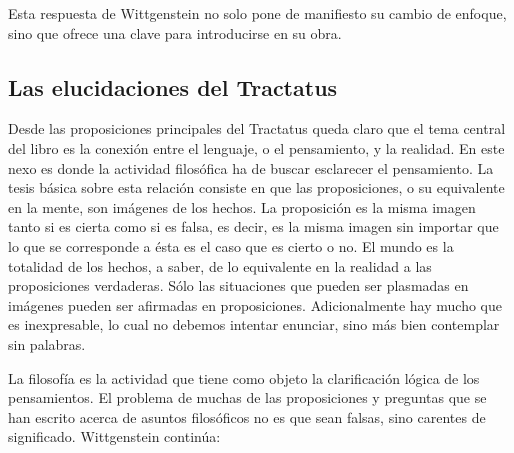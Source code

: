 Esta respuesta de Wittgenstein no solo pone de manifiesto su cambio de enfoque,
sino que ofrece una clave para introducirse en su obra. 


\subsection{Las elucidaciones del Tractatus}
Desde las proposiciones principales del Tractatus queda claro que el tema
central del libro es la conexión entre el lenguaje, o el pensamiento, y la
realidad.  
En este nexo es donde la actividad filosófica ha de buscar esclarecer el
pensamiento.
La tesis básica sobre esta relación consiste en que las proposiciones, o su
equivalente en la mente, son imágenes de los hechos.
La proposición es la misma imagen tanto si es cierta como si es falsa, es decir,
es la misma imagen sin importar que lo que se corresponde a ésta es el caso que
es cierto o no. El mundo es la totalidad de los hechos, a saber, de lo
equivalente en la realidad a las proposiciones verdaderas.
Sólo las situaciones que pueden ser plasmadas en imágenes pueden ser afirmadas
en proposiciones. Adicionalmente hay mucho que es inexpresable, lo cual no
debemos intentar enunciar, sino más bien contemplar sin palabras.\autocite[cf.
p.19]{IWT}


La filosofía es la actividad que tiene como objeto la clarificación lógica
de los pensamientos.\autocite[4.112 p. 52]{tractatus} El problema de muchas de
las proposiciones y preguntas que se han escrito acerca de asuntos filosóficos
no es que sean falsas, sino carentes de significado. Wittgenstein continúa: 

